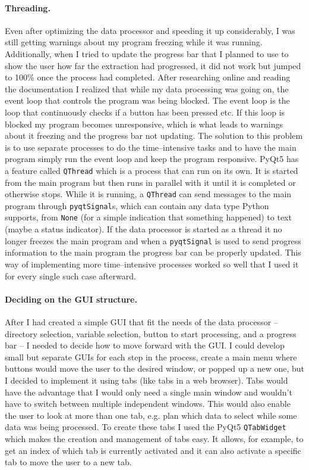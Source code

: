 \documentclass[../00_main.tex]{subfiles}
\begin{document}
\paragraph{Threading.} Even after optimizing the data processor and speeding it
up considerably, I was still getting warnings about my program freezing while
it was running. Additionally, when I tried to update the progress bar that
I planned to use to show the user how far the extraction had progressed, it did
not work but jumped to 100\% once the process had completed. After researching
online and reading the documentation I realized that while my data processing
was going on, the event loop that controls the program was being blocked. The
event loop is the loop that continuously checks if a button has been pressed
etc. If this loop is blocked my program becomes unresponsive, which is what
leads to warnings about it freezing and the progress bar not updating. The
solution to this problem is to use separate processes to do the time--intensive
tasks and to have the main program simply run the event loop and keep the
program responsive. PyQt5 has a feature called \texttt{QThread} which is
a process that can run on its own. It is started from the main program but then
runs in parallel with it until it is completed or otherwise stops. While it is
running, a \texttt{QThread} can send messages to the main program through
\texttt{pyqtSignal}s, which can contain any data type Python supports, from
\texttt{None} (for a simple indication that something happened) to text (maybe
a status indicator). If the data processor is started as a thread it no longer
freezes the main program and when a \texttt{pyqtSignal} is used to send
progress information to the main program the progress bar can be properly
updated. This way of implementing more time--intensive processes worked so well
that I used it for every single such case afterward.

\paragraph{Deciding on the GUI structure.} After I had created a simple GUI
that fit the needs of the data processor -- directory selection, variable
selection, button to start processing, and a progress bar -- I needed to decide
how to move forward with the GUI. I could develop small but separate GUIs for
each step in the process, create a main menu where buttons would move the user
to the desired window, or popped up a new one, but I decided to implement it
using tabs (like tabs in a web browser). Tabs would have the advantage that
I would only need a single main window and wouldn't have to switch between
multiple independent windows. This would also enable the user to look at more
than one tab, e.g. plan which data to select while some data was being
processed. To create these tabs I used the PyQt5 \texttt{QTabWidget} which
makes the creation and management of tabs easy. It allows, for example, to get
an index of which tab is currently activated and it can also activate
a specific tab to move the user to a new tab.
\end{document}
